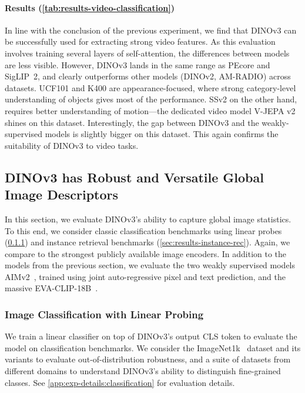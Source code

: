 \paragraph[Results]{Results (\cref{tab:results-video-classification})}
In line with the conclusion of the previous experiment, we find that DINOv3 can be successfully used for extracting strong video features.
As this evaluation involves training several layers of self-attention, the differences between models are less visible.
However, DINOv3 lands in the same range as PEcore and SigLIP~2, and clearly outperforms other models (DINOv2, AM-RADIO) across datasets.
UCF101 and K400 are appearance-focused, where strong category-level understanding of objects gives most of the performance.
SSv2 on the other hand, requires better understanding of motion---the dedicated video model V-JEPA v2 shines on this dataset.
Interestingly, the gap between DINOv3 and the weakly-supervised models is slightly bigger on this dataset.
This again confirms the suitability of DINOv3 to video tasks.


\subsection{DINOv3 has Robust and Versatile Global Image Descriptors}
\label{sec:results-global-features}

In this section, we evaluate DINOv3's ability to capture global image statistics. 
To this end, we consider classic classification benchmarks using linear probes (\cref{sec:results-classification-linear}) and instance retrieval benchmarks (\cref{sec:results-instance-rec}).
Again, we compare to the strongest publicly available image encoders.
In addition to the models from the previous section, we evaluate the two weakly supervised models AIMv2~\citep{fini2024multimodal}, trained using joint auto-regressive pixel and text prediction, and the massive EVA-CLIP-18B~\citep{sun2024eva}.


\subsubsection{Image Classification with Linear Probing}
\label{sec:results-classification-linear}

We train a linear classifier on top of DINOv3's output CLS token to evaluate the model on classification benchmarks.
We consider the ImageNet1k~\citep{deng2009imagenet} dataset and its variants to evaluate out-of-distribution robustness, and a suite of datasets from different domains to understand DINOv3's ability to distinguish fine-grained classes.
See \cref{app:exp-details:classification} for evaluation details.

